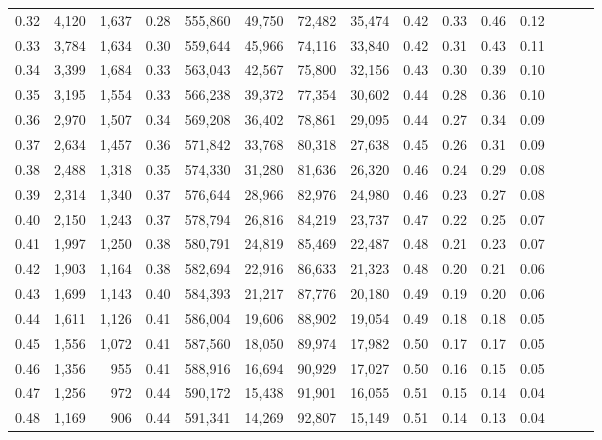 \begin{tabular}{rrrrrrrrrrrrrrr}
0.32 &   4,120 &  1,637 &  0.28 &  555,860 &   49,750 &   72,482 &   35,474 &  0.42 &  0.33 &  0.46 &      0.12 \\
0.33 &   3,784 &  1,634 &  0.30 &  559,644 &   45,966 &   74,116 &   33,840 &  0.42 &  0.31 &  0.43 &      0.11 \\
0.34 &   3,399 &  1,684 &  0.33 &  563,043 &   42,567 &   75,800 &   32,156 &  0.43 &  0.30 &  0.39 &      0.10 \\
0.35 &   3,195 &  1,554 &  0.33 &  566,238 &   39,372 &   77,354 &   30,602 &  0.44 &  0.28 &  0.36 &      0.10 \\
0.36 &   2,970 &  1,507 &  0.34 &  569,208 &   36,402 &   78,861 &   29,095 &  0.44 &  0.27 &  0.34 &      0.09 \\
0.37 &   2,634 &  1,457 &  0.36 &  571,842 &   33,768 &   80,318 &   27,638 &  0.45 &  0.26 &  0.31 &      0.09 \\
0.38 &   2,488 &  1,318 &  0.35 &  574,330 &   31,280 &   81,636 &   26,320 &  0.46 &  0.24 &  0.29 &      0.08 \\
0.39 &   2,314 &  1,340 &  0.37 &  576,644 &   28,966 &   82,976 &   24,980 &  0.46 &  0.23 &  0.27 &      0.08 \\
0.40 &   2,150 &  1,243 &  0.37 &  578,794 &   26,816 &   84,219 &   23,737 &  0.47 &  0.22 &  0.25 &      0.07 \\
0.41 &   1,997 &  1,250 &  0.38 &  580,791 &   24,819 &   85,469 &   22,487 &  0.48 &  0.21 &  0.23 &      0.07 \\
0.42 &   1,903 &  1,164 &  0.38 &  582,694 &   22,916 &   86,633 &   21,323 &  0.48 &  0.20 &  0.21 &      0.06 \\
0.43 &   1,699 &  1,143 &  0.40 &  584,393 &   21,217 &   87,776 &   20,180 &  0.49 &  0.19 &  0.20 &      0.06 \\
0.44 &   1,611 &  1,126 &  0.41 &  586,004 &   19,606 &   88,902 &   19,054 &  0.49 &  0.18 &  0.18 &      0.05 \\
0.45 &   1,556 &  1,072 &  0.41 &  587,560 &   18,050 &   89,974 &   17,982 &  0.50 &  0.17 &  0.17 &      0.05 \\
0.46 &   1,356 &    955 &  0.41 &  588,916 &   16,694 &   90,929 &   17,027 &  0.50 &  0.16 &  0.15 &      0.05 \\
0.47 &   1,256 &    972 &  0.44 &  590,172 &   15,438 &   91,901 &   16,055 &  0.51 &  0.15 &  0.14 &      0.04 \\
0.48 &   1,169 &    906 &  0.44 &  591,341 &   14,269 &   92,807 &   15,149 &  0.51 &  0.14 &  0.13 &      0.04 \\

\end{tabular}
